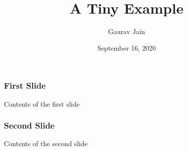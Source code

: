\documentclass{beamer}
\title{A Tiny Example}
\author{Gaurav Jain}
\date{September 16, 2020}
\begin{document}
\maketitle

\begin{frame}
 \frametitle{First Slide}
  Contents of the first slide
\end{frame}

\begin{frame}
 \frametitle{Second Slide}
 Contents of the second slide
\end{frame}
\end{document}
